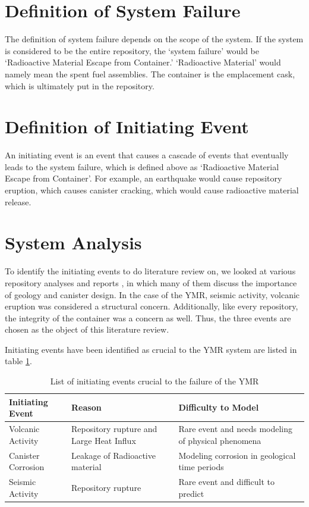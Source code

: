 \documentclass[12pt]{article}
\begin{document}
\section{Definition of System Failure}
The definition of system failure depends on the scope of the system.
If the system is considered to be the entire repository, the `system failure' would be
`Radioactive Material Escape from Container.'
`Radioactive Material' would namely mean the spent fuel assemblies.
The container is the emplacement cask, which is ultimately put in the repository.


\section{Definition of Initiating Event}
An initiating event is an event that causes a cascade of events that eventually leads
to the system failure, which is defined above as `Radioactive Material Escape
from Container'.  For example, an earthquake would cause repository eruption, which 
causes canister cracking, which would cause radioactive material release.  


\section{System Analysis}
To identify the initiating events to do literature review on,
we looked at various repository analyses and reports \cite{u.s._department_of_energy_office_of_civilian_radioactive_waste_management_national_2008, wilson_total-system_1994, rechard_evolution_2014, u.s._department_of_energy_yucca_2002},
in which many of them discuss the importance of geology and canister design.
In the case of the \gls{YMR}, seismic activity, volcanic eruption was considered
a structural concern. Additionally, like every repository, the integrity
of the container was a concern as well. Thus, the three events are chosen
as the object of this literature review.

Initiating events have been identified as crucial to the 
\gls{YMR} system are listed in table \ref{tab:ie}.
\begin{table}[h]
    \centering
        \begin{tabularx}{\linewidth}{mbb}
            \hline
            \textbf{Initiating Event} & \textbf{Reason} & \textbf{Difficulty to Model} \\ \hline
            \small{Volcanic Activity} & Repository rupture and Large Heat Influx & Rare event and needs modeling of physical phenomena \cite{marzocchi_quantifying_2004} \\ 
            \small{Canister Corrosion} & Leakage of Radioactive material & Modeling corrosion in geological time periods \cite{sadiq_probabilistic_2004, oldenburg_low-probability_2016} \\
            \small{Seismic Activity} & Repository rupture & Rare event and difficult to predict \cite{ward_multidisciplinary_1994} \\ \hline
        \end{tabularx}
        \caption{List of initiating events crucial to the failure of the \gls{YMR}}
        \label{tab:ie}
\end {table}
\end{document}
